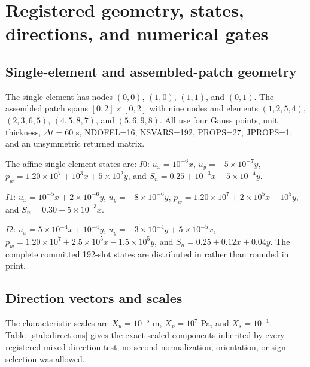 \documentclass[preprint,12pt,authoryear]{elsarticle}
\begin{document}
\section{Registered geometry, states, directions, and numerical gates}

\subsection{Single-element and assembled-patch geometry}

The single element has nodes $(0,0)$, $(1,0)$, $(1,1)$, and $(0,1)$. The assembled patch spans $[0,2]\times[0,2]$ with nine nodes and elements $(1,2,5,4)$, $(2,3,6,5)$, $(4,5,8,7)$, and $(5,6,9,8)$. All use four Gauss points, unit thickness, $\Delta t=60$ s, NDOFEL=16, NSVARS=192, PROPS=27, JPROPS=1, and an unsymmetric returned matrix.

The affine single-element states are:
\noindent $I0$: $u_x=10^{-6}x$, $u_y=-5\times10^{-7}y$,
$p_w=1.20\times10^7+10^3x+5\times10^2y$, and
$S_n=0.25+10^{-3}x+5\times10^{-4}y$.

\noindent $I1$: $u_x=10^{-5}x+2\times10^{-6}y$, $u_y=-8\times10^{-6}y$,
$p_w=1.20\times10^7+2\times10^5x-10^5y$, and
$S_n=0.30+5\times10^{-3}x$.

\noindent $I2$: $u_x=5\times10^{-4}x+10^{-4}y$,
$u_y=-3\times10^{-4}y+5\times10^{-5}x$,
$p_w=1.20\times10^7+2.5\times10^5x-1.5\times10^5y$, and
$S_n=0.25+0.12x+0.04y$.
The complete committed 192-slot states are distributed in  rather than rounded in print.

\subsection{Direction vectors and scales}

The characteristic scales are $X_u=10^{-5}$ m, $X_p=10^7$ Pa, and $X_s=10^{-1}$. Table~\ref{stab:directions} gives the exact scaled components inherited by every registered mixed-direction test; no second normalization, orientation, or sign selection was allowed.
\end{document}

